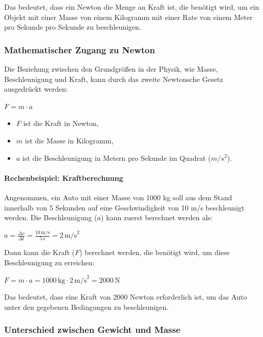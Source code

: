\documentclass{vorlage-design-main}
\begin{document}
Das bedeutet, dass ein Newton die Menge an Kraft ist, die benötigt wird,
um ein Objekt mit einer Masse von einem Kilogramm mit einer Rate von
einem Meter pro Sekunde pro Sekunde zu beschleunigen.

\hypertarget{mathematischer-zugang-zu-newton}{%
\subsubsection{Mathematischer Zugang zu
Newton}\label{mathematischer-zugang-zu-newton}}

Die Beziehung zwischen den Grundgrößen in der Physik, wie Masse,
Beschleunigung und Kraft, kann durch das zweite Newtonsche Gesetz
ausgedrückt werden:

$F = m \cdot a$

\begin{itemize}

\item
  $F$ ist die Kraft in Newton,
\item
  $m$ ist die Masse in Kilogramm,
\item
  $a$ ist die Beschleunigung in Metern pro Sekunde im Quadrat
  ($m/s^2$).
\end{itemize}

\hypertarget{rechenbeispiel-kraftberechnung}{%
\paragraph{Rechenbeispiel:
Kraftberechnung}\label{rechenbeispiel-kraftberechnung}}

Angenommen, ein Auto mit einer Masse von 1000 kg soll aus dem Stand
innerhalb von 5 Sekunden auf eine Geschwindigkeit von 10 m/s
beschleunigt werden. Die Beschleunigung ($a$) kann zuerst berechnet
werden als:

$a = \frac{\Delta v}{\Delta t} = \frac{10 \, \text{m/s}}{5 \, \text{s}} = 2 \, \text{m/s}^2$

Dann kann die Kraft ($F$) berechnet werden, die benötigt wird, um
diese Beschleunigung zu erreichen:

$F = m \cdot a = 1000 \, \text{kg} \cdot 2 \, \text{m/s}^2 = 2000 \, \text{N}$

Das bedeutet, dass eine Kraft von 2000 Newton erforderlich ist, um das
Auto unter den gegebenen Bedingungen zu beschleunigen.

\hypertarget{unterschied-zwischen-gewicht-und-masse}{%
\subsubsection{Unterschied zwischen Gewicht und
Masse}\label{unterschied-zwischen-gewicht-und-masse}}
\end{document}
